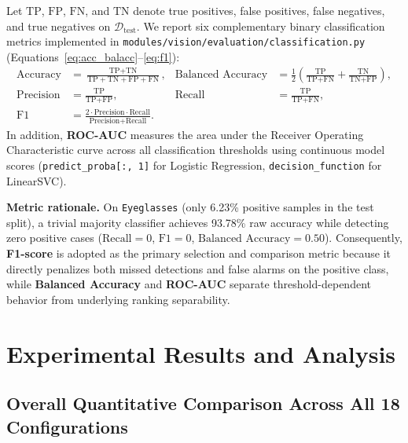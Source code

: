 \documentclass[12pt,a4paper]{article}
\newcommand{\code}[1]{\texttt{#1}}
\begin{document}
Let $\text{TP}$, $\text{FP}$, $\text{FN}$, and $\text{TN}$ denote true positives, false positives, false negatives, and true negatives on $\mathcal{D}_{\text{test}}$. We report six complementary binary classification metrics implemented in \code{modules/\allowbreak{}vision/\allowbreak{}evaluation/\allowbreak{}classification.py} (Equations~\eqref{eq:acc_balacc}--\eqref{eq:f1}):
\begin{align}
  \text{Accuracy} &= \frac{\text{TP} + \text{TN}}{\text{TP} + \text{TN} + \text{FP} + \text{FN}}, &
  \text{Balanced Accuracy} &= \frac{1}{2}\!\left(\frac{\text{TP}}{\text{TP} + \text{FN}} + \frac{\text{TN}}{\text{TN} + \text{FP}}\right), \label{eq:acc_balacc} \\
  \text{Precision} &= \frac{\text{TP}}{\text{TP} + \text{FP}}, &
  \text{Recall} &= \frac{\text{TP}}{\text{TP} + \text{FN}}, \label{eq:pr} \\
  \text{F1} &= \frac{2 \cdot \text{Precision} \cdot \text{Recall}}{\text{Precision} + \text{Recall}}. \label{eq:f1}
\end{align}
In addition, \textbf{ROC-AUC} measures the area under the Receiver Operating Characteristic curve across all classification thresholds using continuous model scores (\code{predict\_\allowbreak{}proba[:, 1]} for Logistic Regression, \code{decision\_\allowbreak{}function} for LinearSVC).

\textbf{Metric rationale.} On \code{Eyeglasses} (only 6.23\% positive samples in the test split), a trivial majority classifier achieves 93.78\% raw accuracy while detecting zero positive cases ($\text{Recall} = 0$, $\text{F1} = 0$, $\text{Balanced Accuracy} = 0.50$). Consequently, \textbf{F1-score} is adopted as the primary selection and comparison metric because it directly penalizes both missed detections and false alarms on the positive class, while \textbf{Balanced Accuracy} and \textbf{ROC-AUC} separate threshold-dependent behavior from underlying ranking separability.

\section{Experimental Results and Analysis}
\label{sec:results}

\subsection{Overall Quantitative Comparison Across All 18 Configurations}
\label{subsec:overall_results}
\end{document}
